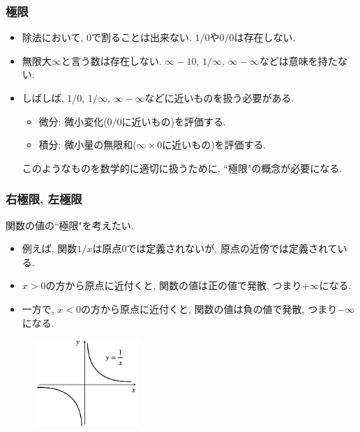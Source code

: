 \documentclass[dvipdfmx,cjk,10.2pt]{beamer}
\theoremstyle{definition}
\begin{document}
\begin{frame}
\frametitle{極限}



\begin{itemize}
\item 除法において, $0$で割ることは出来ない. $1/0$や$0/0$は存在しない. 
\item 無限大$\infty$と言う数は存在しない. $\infty-10$, $1/\infty$, $\infty - \infty$などは意味を持たない. 
\item しばしば, $1/0$, $1/\infty$, $\infty - \infty$などに近いものを扱う必要がある.
\begin{itemize}
\item 微分: 微小変化($0/0$に近いもの)を評価する. 
\item 積分: 微小量の無限和($\infty \times 0$に近いもの)を評価する. 
\end{itemize}
このようなものを数学的に適切に扱うために, ``極限"の概念が必要になる. 
\end{itemize}

\end{frame}







\begin{frame}
\frametitle{右極限, 左極限}

関数の値の``極限"を考えたい. 

\begin{itemize}
\item 例えば, 関数$1/x$は原点$0$では定義されないが, 原点の近傍では定義されている. 
\item $x>0$の方から原点に近付くと, 関数の値は正の値で発散, つまり$+\infty$になる. 
\item 一方で, $x<0$の方から原点に近付くと, 関数の値は負の値で発散, つまり$-\infty$になる. 
\end{itemize}

\vspace{-1mm}

 \begin{figure}[htbp]
 \begin{center} 
  \includegraphics[width=40mm]{xinv.png}
 \end{center}
\end{figure}

\vspace{-1mm}

\end{frame}
\end{document}
